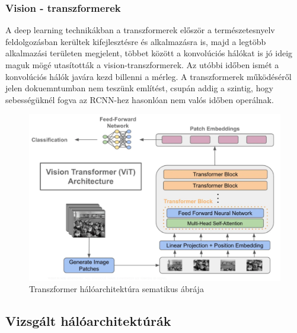 \documentclass{article}
\begin{document}
\subsubsection{Vision - transzformerek}
A deep learning technikákban a transzformerek először a természetesnyelv feldolgozásban 
kerültek kifejlesztésre és alkalmazásra is, majd 
a legtöbb alkalmazási területen megjelent, többet között
a konvolúciós hálókat is jó ideig maguk mögé utasították 
a vision-transzformerek. Az utóbbi időben ismét 
a konvolúciós hálók javára kezd billenni a mérleg. 
A transzformerek működéséről jelen dokuemntumban nem teszünk 
említést, csupán addig a szintig, hogy sebességüknél fogva
az RCNN-hez hasonlóan nem valós időben operálnak.
\begin{figure}[h]
    \centering
    \includegraphics[scale=0.5]{transform.png}
    \caption{Transzformer hálóarchitektúra sematikus ábrája}
\end{figure}

\subsection{Vizsgált hálóarchitektúrák}
\end{document}
